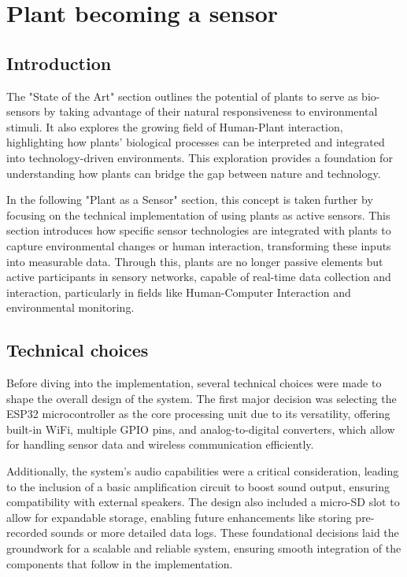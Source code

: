 \section{Plant becoming a sensor}


\subsection{Introduction}

The "State of the Art" section outlines the potential of plants to serve as bio-sensors by taking advantage of their natural responsiveness to environmental stimuli. It also explores the growing field of Human-Plant interaction, highlighting how plants' biological processes can be interpreted and integrated into technology-driven environments. This exploration provides a foundation for understanding how plants can bridge the gap between nature and technology.

In the following "Plant as a Sensor" section, this concept is taken further by focusing on the technical implementation of using plants as active sensors. This section introduces how specific sensor technologies are integrated with plants to capture environmental changes or human interaction, transforming these inputs into measurable data. Through this, plants are no longer passive elements but active participants in sensory networks, capable of real-time data collection and interaction, particularly in fields like Human-Computer Interaction and environmental monitoring.

\subsection{Technical choices}

Before diving into the implementation, several technical choices were made to shape the overall design of the system. The first major decision was selecting the ESP32 microcontroller as the core processing unit due to its versatility, offering built-in WiFi, multiple GPIO pins, and analog-to-digital converters, which allow for handling sensor data and wireless communication efficiently.

Additionally, the system's audio capabilities were a critical consideration, leading to the inclusion of a basic amplification circuit to boost sound output, ensuring compatibility with external speakers. The design also included a micro-SD slot to allow for expandable storage, enabling future enhancements like storing pre-recorded sounds or more detailed data logs. These foundational decisions laid the groundwork for a scalable and reliable system, ensuring smooth integration of the components that follow in the implementation.

